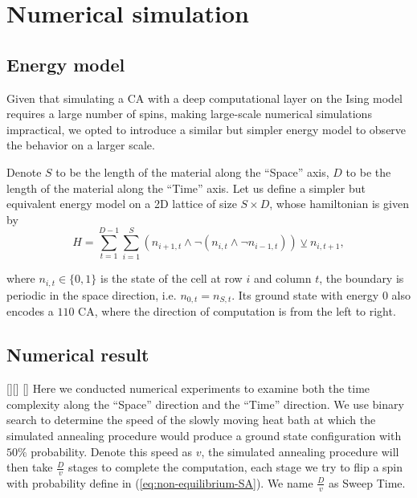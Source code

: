 \documentclass[twocolumn,superscriptaddress,english,showpacs,longbibliography]{revtex4-2}
\newcommand{\jinguo}[1]{[{\color{blue}{JGL: #1}}]}
\newcommand{\ym}[1]{[{\color{red}{YM: #1}}]}
\begin{document}
\section{Numerical simulation}\label{sec:numerical-result}

\subsection{Energy model}\label{a-2d-surface-programmable-material}

Given that simulating a CA with a deep computational layer on the Ising model requires a large number of spins, making large-scale numerical simulations impractical, we opted to introduce a similar but simpler energy model to observe the behavior on a larger scale.

Denote $S$ to be the length of the material along the ``Space'' axis, $D$
to be the length of the material along the ``Time'' axis. 
Let us define a simpler but equivalent energy model on a 2D lattice of size $S \times D$, whose hamiltonian
is given by
\begin{equation}\label{eq:toy-hamiltonian}
H = \sum_{t=1}^{D-1}\sum_{i=1}^{S} (n_{i+1, t} \land \neg(n_{i, t} \land \neg n_{i-1, t})) \veebar n_{i,t+1},
\end{equation}

where $n_{i, t} \in \{0, 1\}$ is the state of the cell at row $i$ and column $t$, the boundary is periodic in the space direction, i.e. $n_{0, t} = n_{S, t}$.
Its ground state with energy $0$ also encodes a $110$ CA, where the direction of computation is from the left to right.
\subsection{Numerical result}

\jinguo{show a comparison from right to left}\jinguo{I have already used D as the dimension}
\ym{Great, i will do this}
Here we conducted numerical experiments to examine both the time complexity along the ``Space'' direction and the ``Time'' direction.
We use binary search to determine the speed of the slowly moving heat bath at which
the simulated annealing procedure would produce 
a ground state configuration with $50\%$ probability. Denote this speed 
as $v$, the simulated annealing procedure will then take $\frac{D}{v}$
stages to complete the computation, each stage we try to flip a spin with 
probability define in (\ref{eq:non-equilibrium-SA}). We name $\frac{D}{v}$ 
as Sweep Time.
\end{document}
